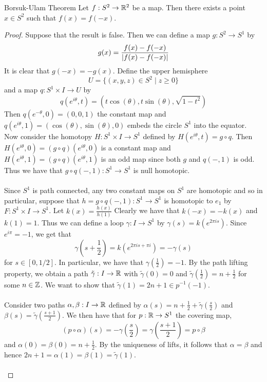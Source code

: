 \documentclass[a4paper]{article}
\begin{document}
\begin{prp}{Borsuk-Ulam Theorem}{} Let $f:S^2\to\mathbb{R}^2$ be a map. Then there exists a point $x\in S^2$ such that $f(x)=f(-x)$. \tcbline
\begin{proof}
Suppose that the result is false. Then we can define a map $g:S^2\to S^1$ by $$g(x)=\frac{f(x)-f(-x)}{\abs{f(x)-f(-x)}}$$ It is clear that $g(-x)=-g(x)$. Define the upper hemisphere $$U=\{(x,y,z)\in S^2\;|\;z\geq 0\}$$ and a map $q:S^1\times I\to U$ by $$q(e^{i\theta},t)=\left(t\cos(\theta),t\sin(\theta),\sqrt{1-t^2}\right)$$ Then $q(e^{-\theta},0)=(0,0,1)$ the constant map and $q(e^{i\theta},1)=(\cos(\theta),\sin(\theta),0)$ embeds the circle $S^1$ into the equator. Now consider the homotopy $H:S^1\times I\to S^1$ defined by $H(e^{i\theta},t)=g\circ q$. Then $H(e^{i\theta},0)=(g\circ q)(e^{i\theta},0)$ is a constant map and $H(e^{i\theta},1)=(g\circ q)(e^{i\theta},1)$ is an odd map since both $g$ and $q(-,1)$ is odd. Thus we have that $g\circ q(-,1):S^1\to S^1$ is null homotopic. \\~\\

Since $S^1$ is path connected, any two constant maps on $S^1$ are homotopic and so in particular, suppose that $h=g\circ q(-,1):S^1\to S^1$ is homotopic to $e_1$ by $F:S^1\times I\to S^1$. Let $k(x)=\frac{h(x)}{h(1)}$ Clearly we have that $k(-x)=-k(x)$ and $k(1)=1$. Thus we can define a loop $\gamma:I\to S^1$ by $\gamma(s)=k(e^{2\pi is})$. Since $e^{i\pi}=-1$, we get that $$\gamma\left(s+\frac{1}{2}\right)=k(e^{2\pi is+\pi i})=-\gamma(s)$$ for $s\in[0,1/2]$. In particular, we have that $\gamma\left(\frac{1}{2}\right)=-1$. By the path lifting property, we obtain a path $\tilde{\gamma}:I\to\mathbb{R}$ with $\tilde{\gamma}(0)=0$ and $\tilde{\gamma}\left(\frac{1}{2}\right)=n+\frac{1}{2}$ for some $n\in\mathbb{Z}$. We want to show that $\tilde{\gamma}(1)=2n+1\in p^{-1}(-1)$. \\~\\

Consider two paths $\alpha,\beta:I\to\mathbb{R}$ defined by $\alpha(s)=n+\frac{1}{2}+\tilde{\gamma}\left(\frac{s}{2}\right)$ and $\beta(s)=\tilde{\gamma}\left(\frac{s+1}{2}\right)$. We then have that for $p:\mathbb{R}\to S^1$ the covering map, $$(p\circ\alpha)(s)=-\gamma\left(\frac{s}{2}\right)=\gamma\left(\frac{s+1}{2}\right)=p\circ\beta$$ and $\alpha(0)=\beta(0)=n+\frac{1}{2}$. By the uniqueness of lifts, it follows that $\alpha=\beta$ and hence $2n+1=\alpha(1)=\beta(1)=\tilde{\gamma}(1)$. \\~\\


\end{proof}
\end{prp}
\end{document}
